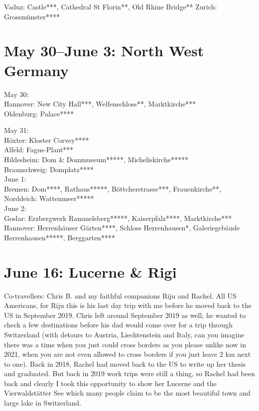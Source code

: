 Vaduz: Castle***, Cathedral St Florin**, Old Rhine Bridge**
Zurich: Grossm\"unster****

\section{May 30--June 3: North West Germany}
\label{2019:Northwestgermany}

May 30:\\
Hannover: New City Hall***, Welfenschloss**, Marktkirche***\\
Oldenburg: Palace****

May 31:\\
H\"oxter: Kloster Corvey****\\
Alfeld: Fagus-Plant***\\
Hildesheim: Dom \& Dommuseum*****, Micheliskirche*****\\
Braunschweig: Domplatz****\\

June 1:\\
Bremen: Dom****, Rathaus*****, B\"ottcherstrasse***, Frauenkirche**, Norddeich: Wattenmeer*****\\

June 2:\\
Goslar: Erzbergwerk Rammelsberg*****, Kaiserpfalz****, Marktkirche***\\
Hannover: Herrenh\"auser G\"arten****, Schloss Herrenhausen*, Galeriegeb\"aude Herrenhausen*****, Berggarten****

\section{June 16: Lucerne \& Rigi}
\label{LucerneRigi2019}

Co-travellers: Chris B. and my faithful companions Riju and Rachel. All US Americans, for Riju this is his last day trip with me before he moved back to the US in September 2019. Chris left around September 2019 as well, he wanted to check a few destinations before his dad would come over for a trip through Switzerland (with detours to Austria, Liechtenstein and Italy, can you imagine there was a time when you just could cross borders as you please unlike now in 2021, when you are not even allowed to cross borders if you just leave 2 km next to one). Back in 2018, Rachel had moved back to the US to write up her thesis and graduated. But back in 2019 work trips were still a thing, so Rachel had been back and clearly I took this opportunity to show her Lucerne and the Vierwaldst\"atter See which many people claim to be the most beautiful town and large lake in Switzerland.\\

